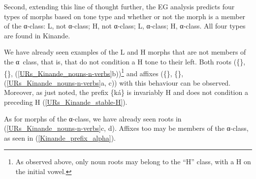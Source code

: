 Second, extending this line of thought further, the EG analysis predicts four types of morphs based on tone type and whether or not the morph is a member of the α-class: L, not α-class; H, not α-class; L, α-class; H, α-class. All four types are found in Kinande.

We have already seen examples of the L and H morphs that are not members of the α\ class, that is, that do not condition a H tone to their left. Both roots (\{\}, \{\}, (\ref{URs_Kinande_nouns-n-verbs}b))\footnote{As observed above, only noun roots may belong to the ``H'' class, with a H on the initial vowel.} and affixes (\{\}, \{\}, (\ref{URs_Kinande_nouns-n-verbs}a, c)) with this behaviour can be observed. Moreover, as just noted, the prefix \{ká\} is invariably H and does not condition a preceding H (\ref{URs_Kinande_stable-H}).

As for morphs of the α-class, we have already seen roots in (\ref{URs_Kinande_nouns-n-verbs}c, d). Affixes too may be members of the α-class, as seen in (\ref{Kinande_prefix_alpha}).

